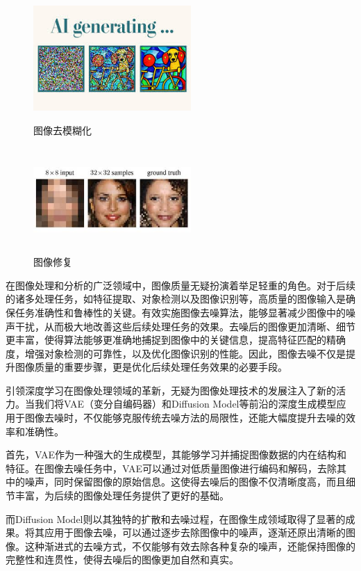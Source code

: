 \begin{figure}[H]
\centering
\begin{minipage}[t]{0.45\linewidth}
\centering
\includegraphics[height=4cm,width=6cm]{Picture/Ai.png}
\caption{图像去模糊化}
\end{minipage}%
\begin{minipage}[t]{0.45\linewidth}
\centering
\includegraphics[height=4cm,width=6cm]{Graduation_thesis/Picture/imagerestore.png}
\caption{图像修复}
\end{minipage}
\end{figure}
在图像处理和分析的广泛领域中，图像质量无疑扮演着举足轻重的角色。对于后续的诸多处理任务，如特征提取、对象检测以及图像识别等，高质量的图像输入是确保任务准确性和鲁棒性的关键。有效实施图像去噪算法，能够显著减少图像中的噪声干扰，从而极大地改善这些后续处理任务的效果。去噪后的图像更加清晰、细节更丰富，使得算法能够更准确地捕捉到图像中的关键信息，提高特征匹配的精确度，增强对象检测的可靠性，以及优化图像识别的性能。因此，图像去噪不仅是提升图像质量的重要步骤，更是优化后续处理任务效果的必要手段。          

引领深度学习在图像处理领域的革新，无疑为图像处理技术的发展注入了新的活力。当我们将VAE（变分自编码器）和Diffusion Model等前沿的深度生成模型应用于图像去噪时，不仅能够克服传统去噪方法的局限性，还能大幅度提升去噪的效率和准确性。

首先，VAE作为一种强大的生成模型，其能够学习并捕捉图像数据的内在结构和特征。在图像去噪任务中，VAE可以通过对低质量图像进行编码和解码，去除其中的噪声，同时保留图像的原始信息。这使得去噪后的图像不仅清晰度高，而且细节丰富，为后续的图像处理任务提供了更好的基础。

而Diffusion Model则以其独特的扩散和去噪过程，在图像生成领域取得了显著的成果。将其应用于图像去噪，可以通过逐步去除图像中的噪声，逐渐还原出清晰的图像。这种渐进式的去噪方式，不仅能够有效去除各种复杂的噪声，还能保持图像的完整性和连贯性，使得去噪后的图像更加自然和真实。

